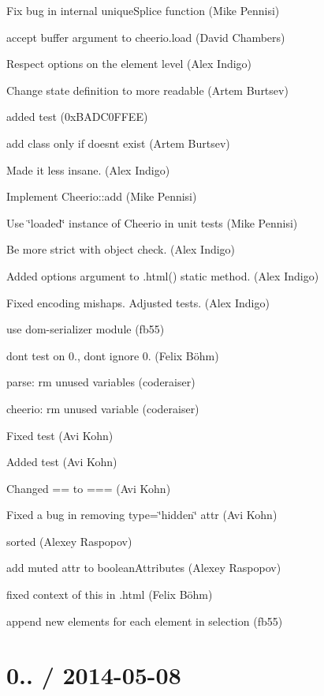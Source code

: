 \begin{DoxyItemize}
\item Fix bug in internal {\ttfamily unique\+Splice} function (Mike Pennisi)
\item accept buffer argument to cheerio.\+load (David Chambers)
\item Respect options on the element level (Alex Indigo)
\item Change state definition to more readable (Artem Burtsev)
\item added test (0x\+B\+A\+D\+C0\+F\+F\+EE)
\item add class only if doesn\textquotesingle{}t exist (Artem Burtsev)
\item Made it less insane. (Alex Indigo)
\item Implement {\ttfamily Cheerio\+::add} (Mike Pennisi)
\item Use \char`\"{}loaded\char`\"{} instance of Cheerio in unit tests (Mike Pennisi)
\item Be more strict with object check. (Alex Indigo)
\item Added options argument to .html() static method. (Alex Indigo)
\item Fixed encoding mishaps. Adjusted tests. (Alex Indigo)
\item use dom-\/serializer module (fb55)
\item don\textquotesingle{}t test on 0., don\textquotesingle{}t ignore 0. (Felix Böhm)
\item parse\+: rm unused variables (coderaiser)
\item cheerio\+: rm unused variable (coderaiser)
\item Fixed test (Avi Kohn)
\item Added test (Avi Kohn)
\item Changed == to === (Avi Kohn)
\item Fixed a bug in removing type=\char`\"{}hidden\char`\"{} attr (Avi Kohn)
\item sorted (Alexey Raspopov)
\item add {\ttfamily muted} attr to boolean\+Attributes (Alexey Raspopov)
\item fixed context of {\ttfamily this} in .html (Felix Böhm)
\item append new elements for each element in selection (fb55)
\end{DoxyItemize}

\section*{0.. / 2014-\/05-\/08 }


